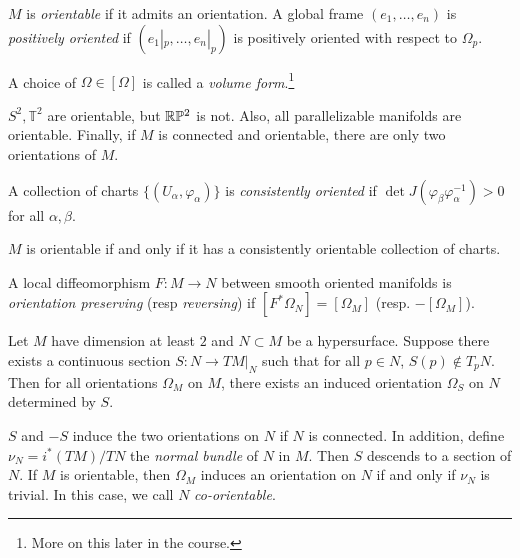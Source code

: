 \documentclass[twoside, 10pt]{article}
\begin{document}
    \begin{defn}
        $M$ is \textit{orientable} if it admits an orientation. A global frame $(e_1, \ldots, e_n)$ is \textit{positively oriented} if $(e_1|_p, \ldots, e_n|_p)$ is positively oriented with respect to $\Omega_p$.
    \end{defn}

    \begin{defn}
        A choice of $\Omega \in [\Omega]$ is called a \textit{volume form}.\footnote{More on this later in the course.}
    \end{defn}

    \begin{rmk}
        $S^2, \mathbb{T}^2$ are orientable, but $\mathbb{R}\mathbb{P}^2$ is not. Also, all parallelizable manifolds are orientable. Finally, if $M$ is connected and orientable, there are only two orientations of $M$.
    \end{rmk}

    \begin{defn}
        A collection of charts $\{(U_{\alpha}, \varphi_{\alpha})\}$ is \textit{consistently oriented} if $\det J(\varphi_{\beta} \varphi_{\alpha}^{-1}) > 0$ for all $\alpha,\beta$.
    \end{defn}

    \begin{exer}
        $M$ is orientable if and only if it has a consistently orientable collection of charts.
    \end{exer}

    \begin{defn}
        A local diffeomorphism $F:M \to N$ between smooth oriented manifolds is \textit{orientation preserving} (resp \textit{reversing}) if $[F^*\Omega_N] = [\Omega_M]$ (resp. $-[\Omega_M]$).
    \end{defn}

    \begin{prop}
        Let $M$ have dimension at least $2$ and $N \subset M$ be a hypersurface. Suppose there exists a continuous section $S: N \to TM|_N$ such that for all $p \in N$, $S(p) \notin T_pN$. Then for all orientations $\Omega_M$ on $M$, there exists an induced orientation $\Omega_S$ on $N$ determined by $S$.
    \end{prop}

    \begin{rmk}
        $S$ and $-S$ induce the two orientations on $N$ if $N$ is connected. In addition, define $\nu_N = i^*(TM) / TN$ the \textit{normal bundle} of $N$ in $M$. Then $S$ descends to a section of $N$. If $M$ is orientable, then $\Omega_M$ induces an orientation on $N$ if and only if $\nu_N$ is trivial. In this case, we call $N$ \textit{co-orientable}.
    \end{rmk}
\end{document}
